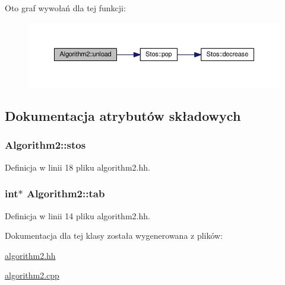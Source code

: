 Oto graf wywołań dla tej funkcji\-:\nopagebreak
\begin{figure}[H]
\begin{center}
\leavevmode
\includegraphics[width=350pt]{class_algorithm2_a3d7e4d0c9308d0b97250cb5596a73165_cgraph}
\end{center}
\end{figure}




\subsection{Dokumentacja atrybutów składowych}
\hypertarget{class_algorithm2_a02585cbfa5330f4719cf97c02729e74a}{
\subsubsection[{stos}]{ Algorithm2\-::stos\hspace{0.3cm}{\ttfamily [private]}}}\label{class_algorithm2_a02585cbfa5330f4719cf97c02729e74a}


Definicja w linii 18 pliku algorithm2.\-hh.

\hypertarget{class_algorithm2_afb40ae7f1e1044802daa927fc7eac7a7}{
\subsubsection[{tab}]{\setlength{\rightskip}{0pt plus 5cm}int$\ast$ Algorithm2\-::tab\hspace{0.3cm}{\ttfamily [private]}}}\label{class_algorithm2_afb40ae7f1e1044802daa927fc7eac7a7}


Definicja w linii 14 pliku algorithm2.\-hh.



Dokumentacja dla tej klasy została wygenerowana z plików\-:\begin{DoxyCompactItemize}
\item 
\hyperlink{algorithm2_8hh}{algorithm2.\-hh}\item 
\hyperlink{algorithm2_8cpp}{algorithm2.\-cpp}\end{DoxyCompactItemize}
